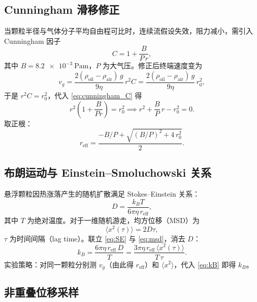 \documentclass[12pt,a4paper]{ctexart}
\begin{document}
\subsection{Cunningham 滑移修正}

当颗粒半径与气体分子平均自由程可比时，连续流假设失效，阻力减小，需引入 Cunningham 因子
\begin{equation}
  C = 1 + \frac{B}{P\,r},
  \label{eq:cunningham_C}
\end{equation}
其中 $B = \SI{8.2e-3}{\pascal\metre}$，$P$ 为大气压。修正后终端速度变为
\begin{equation}
  v_g = \frac{2(\rho_\text{oil}-\rho_\text{air})\,g}{9\eta}\,r^2 C
      = \frac{2(\rho_\text{oil}-\rho_\text{air})\,g}{9\eta}\,r_0^2,
  \label{eq:vg_cunningham}
\end{equation}
于是 $r^2 C = r_0^2$，代入 \eqref{eq:cunningham_C} 得
\begin{equation}
  r^2\!\left(1+\frac{B}{Pr}\right) = r_0^2
  \implies r^2 + \frac{B}{P}\,r - r_0^2 = 0.
  \label{eq:quadratic}
\end{equation}
取正根：
\begin{equation}
  r_\text{eff} = \frac{-B/P + \sqrt{(B/P)^2 + 4\,r_0^2}}{2}.
  \label{eq:r_eff}
\end{equation}

\subsection{布朗运动与 Einstein--Smoluchowski 关系}

悬浮颗粒因热涨落产生的随机扩散满足 Stokes--Einstein 关系：
\begin{equation}
  D = \frac{k_B T}{6\pi\eta\,r_\text{eff}},
  \label{eq:SE}
\end{equation}
其中 $T$ 为绝对温度。对于一维随机游走，均方位移（MSD）为
\begin{equation}
  \langle x^2(\tau)\rangle = 2D\tau,
  \label{eq:msd}
\end{equation}
$\tau$ 为时间间隔（lag time）。联立 \eqref{eq:SE} 与 \eqref{eq:msd}，消去 $D$：
\begin{equation}
  k_B = \frac{6\pi\eta\,r_\text{eff}\,D}{T}
       = \frac{3\pi\eta\,r_\text{eff}\,\langle x^2(\tau)\rangle}{T\,\tau}.
  \label{eq:kB}
\end{equation}
实验策略：对同一颗粒分别测 $v_g$（由此得 $r_\text{eff}$）和 $\langle x^2\rangle$，代入 \eqref{eq:kB} 即得 $k_B$。

\subsection{非重叠位移采样}
\end{document}
